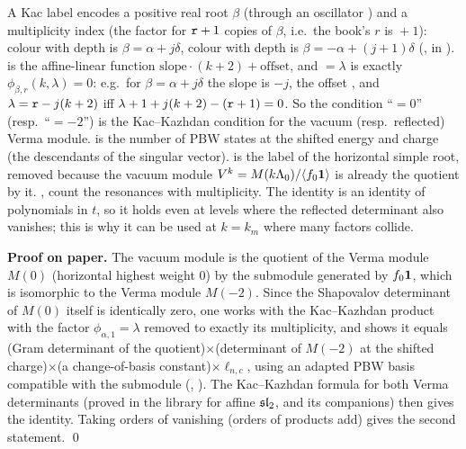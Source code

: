 \begin{dictionary}
A Kac label  encodes a positive real root $\beta$ (through an oscillator ) and a
multiplicity index  (the factor for $\lean{r}+1$ copies of $\beta$, i.e.\ the book's $r$ is ${}+1$):
colour  with depth  is $\beta=\alpha+j\delta$, colour  with depth  is $\beta=-\alpha+(j+1)\delta$
(,  in ).  is the
affine-linear function $\mathrm{slope}\cdot(k+2)+\mathrm{offset}$, and  $=\lambda$ is exactly
$\phi_{\beta,r}(k,\lambda)=0$: e.g.\ for $\beta=\alpha+j\delta$ the slope is $-j$, the offset , and
$\lambda=\lean{r}-j(k+2)$ iff $\lambda+1+j(k+2)-(\lean{r}+1)=0$. So the condition ``$=0$'' (resp.\ ``$=-2$'') is the
Kac--Kazhdan condition for the vacuum (resp.\ reflected) Verma module.
 is the number of PBW states at the shifted energy and charge (the descendants of the
singular vector).  is the label of the horizontal simple root, removed because the vacuum module
$V^k=M(k\Lambda_0)/\langle f_0\mathbf{1}\rangle$ is already the quotient by it. , 
count the resonances with multiplicity. The identity is an identity of polynomials in $t$, so it holds even at levels where
the reflected determinant also vanishes; this is why it can be used at $k=k_m$ where many factors collide.
\end{dictionary}

\textbf{Proof on paper.} The vacuum module is the quotient of the Verma module $M(0)$ (horizontal highest weight $0$) by
the submodule generated by $f_0\mathbf{1}$, which is isomorphic to the Verma module $M(-2)$. Since the Shapovalov
determinant of $M(0)$ itself is identically zero, one works with the Kac--Kazhdan product with the factor
$\phi_{\alpha,1}=\lambda$ removed to exactly its multiplicity, and shows it equals (Gram determinant of the
quotient)$\times$(determinant of $M(-2)$ at the shifted charge)$\times$(a change-of-basis constant)$\times\ell_{n,c}$,
using an adapted PBW basis compatible with the submodule
(, ). The Kac--Kazhdan formula
for both Verma determinants (proved in the library for affine $\mathfrak{sl}_2$,  and its
companions) then gives the identity.
Taking orders of vanishing (orders of products add) gives the second statement. \qed

